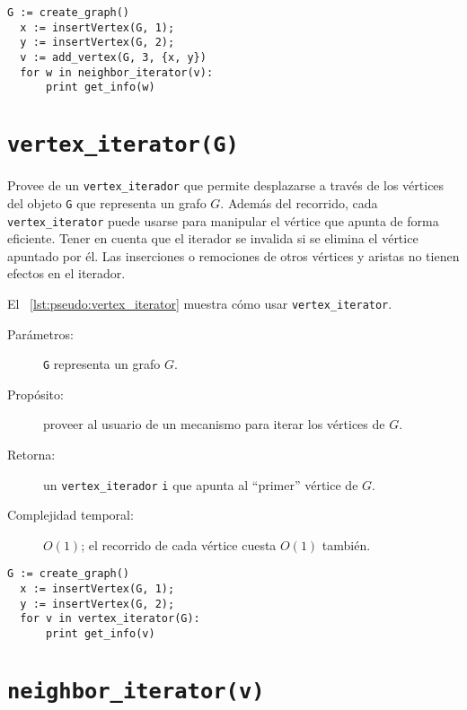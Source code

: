 \documentclass[%
    a4paper,%
    fontsize=12pt,%
    DIV=12,
    twoside,%
    openright,%
    titlepage=true,%
    headsepline,%
    toc=bibliography,%
    parskip=half,%
    cleardoublepage=empty,%
    headings=big,%
]{scrbook}
\makeatletter
\newcommand{\Code}[2][]{\lstinline[basicstyle={\ttfamily},#1]@#2@}
\makeatother
\begin{document}
\begin{lstlisting}[caption={Ejemplo de uso de \Code{add_vertex} para imprimir ``12''.},gobble=2,float=ht,label={lst:pseudo:add_vertex_with_N},emph={add_vertex}]
  G := create_graph()
  x := insertVertex(G, 1);
  y := insertVertex(G, 2);
  v := add_vertex(G, 3, {x, y})
  for w in neighbor_iterator(v):
      print get_info(w)
\end{lstlisting}


\section{\texorpdfstring{\Code{vertex_iterator(G)}}{vertex\_iterator(G)}}%
\label{sec:tad grafo:vertex-iterator}

Provee de un \Code{vertex_iterador} que permite desplazarse a través de los vértices del objeto \Code{G} que representa un grafo $G$.  Además del recorrido, cada \Code{vertex_iterator} puede usarse para manipular el vértice que apunta de forma eficiente.  Tener en cuenta que el iterador se invalida si se elimina el vértice apuntado por él.  Las inserciones o remociones de otros vértices y aristas no tienen efectos en el iterador.

El \lstlistingname~\ref{lst:pseudo:vertex_iterator} muestra cómo usar \Code{vertex_iterator}.

\begin{description}
  \item [Parámetros:] \Code{G} representa un grafo $G$.
  \item [Propósito:] proveer al usuario de un mecanismo para iterar los vértices de $G$.
  \item [Retorna:] un \Code{vertex_iterador} \Code{i} que apunta al ``primer'' vértice de $G$.
  \item [Complejidad temporal:] $O(1)$; el recorrido de cada vértice cuesta $O(1)$ también.
\end{description}


\begin{lstlisting}[caption={Ejemplo de uso de \Code{vertex_iterator} para imprimir alguna permutación de la secuencia 1,2.},gobble=2,float=ht,label={lst:pseudo:vertex_iterator},emph={vertex_iterator}]
  G := create_graph()
  x := insertVertex(G, 1);
  y := insertVertex(G, 2);
  for v in vertex_iterator(G):
      print get_info(v)
\end{lstlisting}


\section{\texorpdfstring{\Code{neighbor_iterator(v)}}{neighbor\_iterator(v)}}%
\label{sec:tad grafo:neighbor-iterator}
\end{document}
